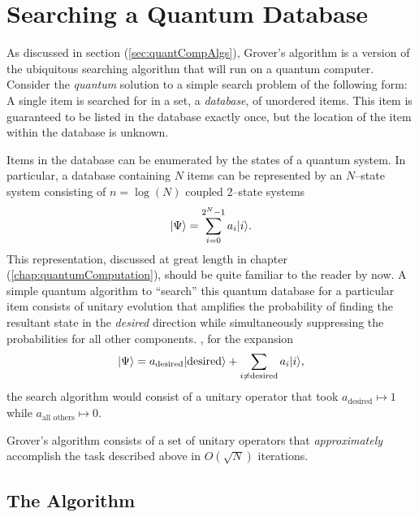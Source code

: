 \section{Searching a Quantum Database}
\label{sec:grover}

As discussed in section (\ref{sec:quantCompAlgs}), Grover's algorithm is
a version of the ubiquitous searching algorithm that will run on a quantum
computer.  Consider the {\sl quantum} solution to a simple search problem of 
the following form: A
single item is searched for in a set, a \emph{database}, of unordered items.  
This item is guaranteed to be listed in the database exactly once, but 
the location of the item within the database is unknown.

Items in the database can be enumerated by the states of a quantum system.
In particular, a database containing $N$ items can be represented by an
$N$--state system consisting of $n=\log(N)$ coupled 2--state systems
\begin{equation}
{|{\Psi}\rangle} = \sum_{i=0}^{2^N-1} a_i{|{i}\rangle}.
\end{equation}
This representation, discussed at great
length in chapter (\ref{chap:quantumComputation}),
should be quite familiar to the reader by now.
A simple quantum algorithm to ``search'' this quantum database
for a particular item consists of unitary evolution that amplifies 
the probability of finding the resultant state in the \emph{desired}
direction while simultaneously suppressing the probabilities for all
other components. \ie, for the expansion
\begin{equation}
{|{\Psi}\rangle} = a_{\text{desired}}{|{\text{desired}}\rangle} +
\sum_{i\ne\text{desired}} a_i{|{i}\rangle},
\end{equation}
the search algorithm would consist of a unitary operator that took
$a_{\text{desired}}\mapsto 1$ while $a_{\text{all others}}\mapsto 0$.

Grover's algorithm consists of a set of unitary operators that
{\sl approximately} accomplish the task described above in 
$O(\sqrt{N})$ iterations.   


\subsection{The Algorithm}

